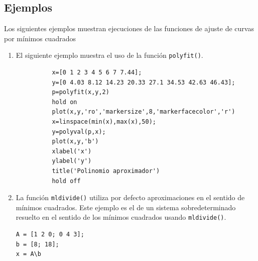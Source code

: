 \documentclass[11pt]{article}
\begin{document}
\subsection{Ejemplos}
                                                                                                                                                                  
Los siguientes ejemplos muestran ejecuciones de las funciones de ajuste de curvas por m\'inimos cuadrados

\begin{enumerate}
	
    \item El siguiente ejemplo muestra el uso de la funci\'on \texttt{polyfit()}.
    \begin{verbatim}
          x=[0 1 2 3 4 5 6 7 7.44];
          y=[0 4.03 8.12 14.23 20.33 27.1 34.53 42.63 46.43];
          p=polyfit(x,y,2)
          hold on
          plot(x,y,'ro','markersize',8,'markerfacecolor','r')
          x=linspace(min(x),max(x),50);
          y=polyval(p,x);
          plot(x,y,'b')
          xlabel('x')
          ylabel('y')
          title('Polinomio aproximador')
          hold off
    \end{verbatim}
    
    \item La funci\'on \texttt{mldivide()} utiliza por defecto aproximaciones en el sentido de m\'inimos cuadrados. Este ejemplo es el de un sistema sobredeterminado resuelto en el sentido de los m\'inimos cuadrados usando \texttt{mldivide()}.
    \begin{verbatim}
A = [1 2 0; 0 4 3];
b = [8; 18];
x = A\b
    \end{verbatim}
    
\end{enumerate}
\end{document}
